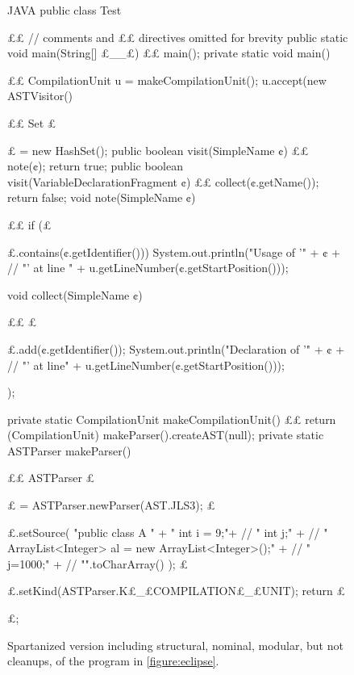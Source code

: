 \begin{figure}
  \caption{Spartanized version including structural, nominal, modular, but
    not cleanups, of the \Java program in \cref{figure:eclipse}.}
  \label{figure:eclipse:spartan}
  \begin{adjustbox}{max width = \columnwidth}
\begin{code}[minipage, width=1.13\columnwidth]{JAVA}
public class Test {££ // comments and ££ directives omitted for brevity
  public static void main(String[] £\_\_£) {££ main(); }
  private static void main() {££
    CompilationUnit u = makeCompilationUnit();
    u.accept(new ASTVisitor() {££
      Set £\ignore$£$ = new HashSet();
      public boolean visit(SimpleName ¢) {££
        note(¢);
        return true;
      }
      public boolean visit(VariableDeclarationFragment ¢) {££
        collect(¢.getName());
        return false;
      }
      void note(SimpleName ¢) {££
        if (£\ignore$£$.contains(¢.getIdentifier()))
          System.out.println("Usage of '" + ¢ + //
            "' at line " + u.getLineNumber(¢.getStartPosition()));
      }
      void collect(SimpleName ¢) {££
        £\ignore$£$.add(¢.getIdentifier());
        System.out.println("Declaration of '" + ¢ + //
          "' at line" + u.getLineNumber(¢.getStartPosition()));
      }
    });
  }
  private static CompilationUnit makeCompilationUnit() {££
    return (CompilationUnit) makeParser().createAST(null);
  }
  private static ASTParser makeParser() {££
    ASTParser £\ignore$£$ = ASTParser.newParser(AST.JLS3);
    £\ignore$£$.setSource(
      "public class A {\n" +
      " int i = 9;\n"+ //
      " int j;\n" + //
      " ArrayList<Integer> al = new ArrayList<Integer>();\n" + //
      " j=1000;\n" + // 
      "}".toCharArray()
);
    £\ignore$£$.setKind(ASTParser.K£\_£COMPILATION£\_£UNIT);
    return £\ignore$£$;
  }
}
\end{code}
  \end{adjustbox}
\end{figure}


